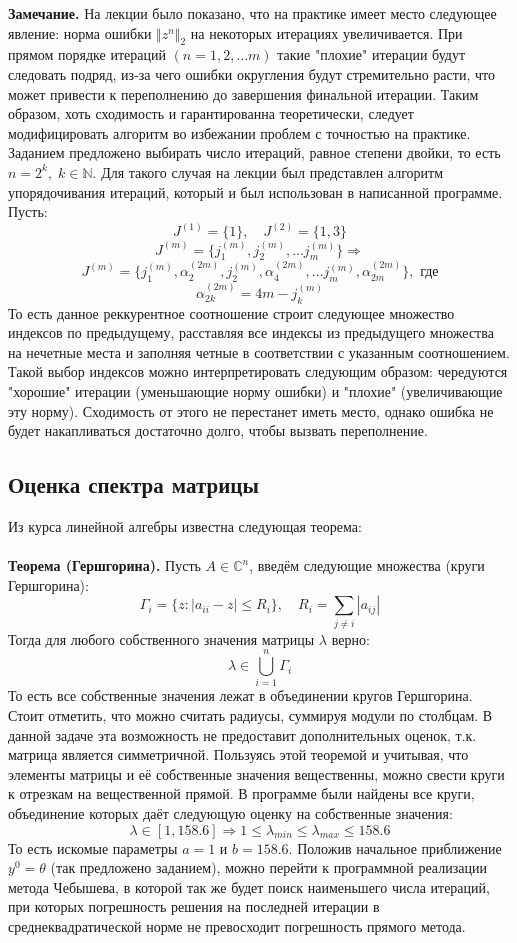 \documentclass[a4paper,12pt,titlepage,final]{article}
\begin{document}
\textbf{Замечание.} На лекции было показано, что на практике имеет место следующее явление: норма ошибки $\Vert z^n \Vert_2$ на некоторых итерациях увеличивается. При прямом порядке итераций $(n = 1, 2, \ldots m)$ такие "плохие" итерации будут следовать подряд, из-за чего ошибки округления будут стремительно расти, что может привести к переполнению до завершения финальной итерации. Таким образом, хоть сходимость и гарантированна теоретически, следует модифицировать алгоритм во избежании проблем с точностью на практике. Заданием предложено выбирать число итераций, равное степени двойки, то есть $n = 2^k, \; k \in \mathbb{N}$. Для такого случая на лекции был представлен алгоритм упорядочивания итераций, который и был использован в написанной программе. Пусть:
$$J^{(1)} = \{1\}, \quad J^{(2)} = \{1, 3\} $$
$$J^{(m)} = \{ j_1^{(m)},  j_2^{(m)}, \ldots j_m^{(m)}\} \Rightarrow$$
$$J^{(m)} = \{ j_1^{(m)}, \alpha_2^{(2m)} , j_2^{(m)}, \alpha_4^{(2m)} , \ldots j_m^{(m)}, \alpha_{2m}^{(2m)}\}, \text{ где}$$
$$\alpha_{2k}^{(2m)} = 4m - j_k^{(m)}$$
То есть данное реккурентное соотношение строит следующее множество индексов по предыдущему, расставляя все индексы из предыдущего множества на нечетные места и заполняя четные в соответствии с указанным соотношением. Такой выбор индексов можно интерпретировать следующим образом: чередуются "хорошие" итерации (уменьшающие норму ошибки) и "плохие" (увеличивающие эту норму). Сходимость от этого не перестанет иметь место, однако ошибка не будет накапливаться достаточно долго, чтобы вызвать переполнение.
\subsection{Оценка спектра матрицы}
Из курса линейной алгебры известна следующая теорема: \\ \\
\textbf{Теорема (Гершгорина).} Пусть $A \in \mathbb{C}^n$, введём следующие множества (круги Гершгорина):
$$\Gamma_i = \{z: |a_{ii} - z| \leq R_i\} ,\quad R_i = \sum_{j\neq i} |a_{ij}|$$
Тогда для любого собственного значения матрицы $\lambda$ верно:
$$\lambda \in \bigcup_{i=1}^n \Gamma_i$$ То есть все собственные значения лежат в объединении кругов Гершгорина. Стоит отметить, что можно считать радиусы, суммируя модули по столбцам. В данной задаче эта возможность не предоставит дополнительных оценок, т.к. матрица является симметричной. Пользуясь этой теоремой и учитывая, что элементы матрицы и её собственные значения вещественны, можно свести круги к отрезкам на вещественной прямой. В программе были найдены все круги, объединение которых даёт следующую оценку на собственные значения: $$\lambda \in [1, 158.6] \Rightarrow 1 \leq \lambda_{min} \leq \lambda_{max} \leq 158.6$$
То есть искомые параметры $a = 1$ и $b = 158.6$. Положив начальное приближение $y^0 = \theta$ (так предложено заданием), можно перейти к программной реализации метода Чебышева, в которой так же будет поиск наименьшего числа итераций, при которых погрешность решения на последней итерации в среднеквадратической норме не превосходит погрешность прямого метода.
\end{document}
